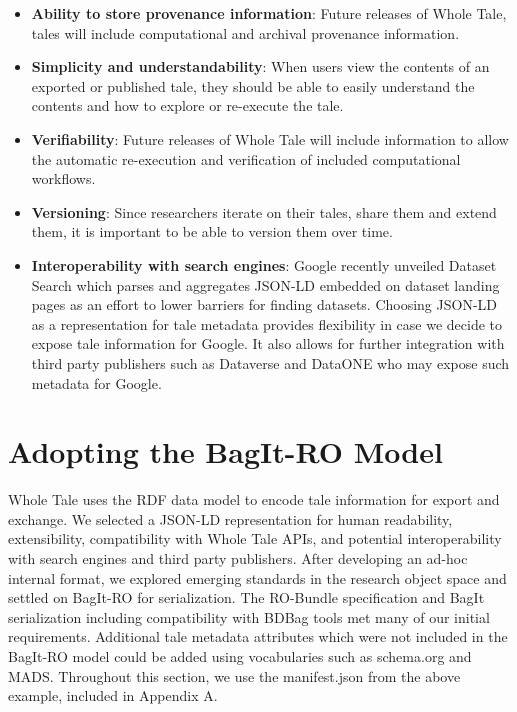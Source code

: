 \documentclass[conference]{IEEEtran}
\begin{document}
\begin{itemize}
\item{{\bf Ability to store provenance information}: Future releases of Whole Tale, tales will include computational and archival provenance information.}
\item{{\bf Simplicity and understandability}: When users view the contents of an exported or published tale, they should be able to easily understand the contents and how to explore or re-execute the tale.}
\item{{\bf Verifiability}: Future releases of Whole Tale will include information to allow the automatic re-execution and verification of included computational workflows.}
\item{{\bf Versioning}: Since researchers iterate on their tales, share them and extend them, it is important to be able to version them over time.}
\item{{\bf Interoperability with search engines}: Google recently unveiled Dataset Search which parses and aggregates JSON-LD embedded on dataset landing pages as an effort to lower barriers for finding datasets. Choosing JSON-LD as a representation for tale metadata provides flexibility in case we decide to expose tale information for Google. It also allows for further integration with third party publishers such as Dataverse and DataONE who may expose such metadata for Google.}
\end{itemize}





\section{Adopting the BagIt-RO Model} \label{adopting}

Whole Tale uses the RDF data model to encode tale information for export and exchange. We selected 
a JSON-LD representation for human readability, extensibility, compatibility with Whole Tale APIs, 
and potential interoperability with search engines and third party publishers. After developing an 
ad-hoc internal format, we explored emerging standards in the research object space and settled on 
BagIt-RO for serialization. The RO-Bundle specification and BagIt serialization including 
compatibility with BDBag tools met many of our initial requirements.  Additional tale metadata 
attributes which were not included in the BagIt-RO model could be added using vocabularies such as 
schema.org and MADS.  Throughout this section, we use the manifest.json from the above example, 
included in Appendix A.
\end{document}
